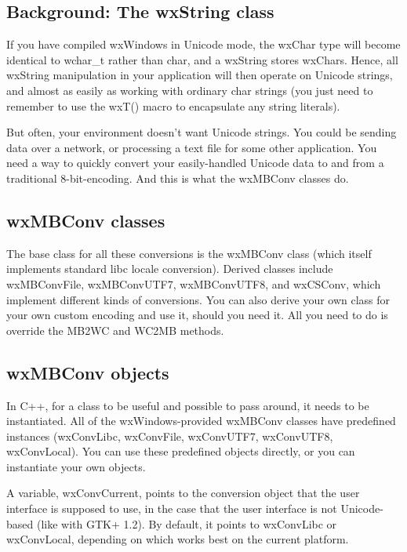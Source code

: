 \subsection{Background: The wxString class}

If you have compiled wxWindows in Unicode mode, the wxChar type will become
identical to wchar\_t rather than char, and a wxString stores wxChars. Hence,
all wxString manipulation in your application will then operate on Unicode
strings, and almost as easily as working with ordinary char strings (you
just need to remember to use the wxT() macro to encapsulate any string
literals).

But often, your environment doesn't want Unicode strings. You could be sending
data over a network, or processing a text file for some other application. You
need a way to quickly convert your easily-handled Unicode data to and from a
traditional 8-bit-encoding. And this is what the wxMBConv classes do.

\subsection{wxMBConv classes}

The base class for all these conversions is the wxMBConv class (which itself
implements standard libc locale conversion). Derived classes include
wxMBConvFile, wxMBConvUTF7, wxMBConvUTF8, and wxCSConv, which implement
different kinds of conversions. You can also derive your own class for your
own custom encoding and use it, should you need it. All you need to do is
override the MB2WC and WC2MB methods.

\subsection{wxMBConv objects}

In C++, for a class to be useful and possible to pass around, it needs to be
instantiated. All of the wxWindows-provided wxMBConv classes have predefined
instances (wxConvLibc, wxConvFile, wxConvUTF7, wxConvUTF8, wxConvLocal).
You can use these predefined objects directly, or you can instantiate your own
objects.

A variable, wxConvCurrent, points to the conversion object that the user interface
is supposed to use, in the case that the user interface is not Unicode-based (like
with GTK+ 1.2). By default, it points to wxConvLibc or wxConvLocal, depending on
which works best on the current platform.

